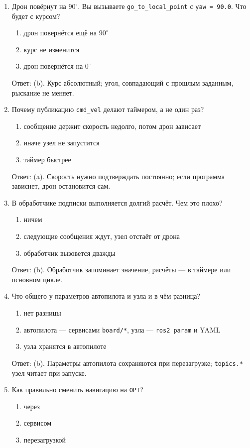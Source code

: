 \begin{enumerate}
  \item Дрон повёрнут на $90^\circ$. Вы вызываете \verb|go_to_local_point| с \verb|yaw = 90.0|. Что будет с курсом?
    \begin{enumerate}[label=(\alph*)] \item дрон повернётся ещё на $90^\circ$ \item курс не изменится \item дрон повернётся на $0^\circ$ \end{enumerate}
    Ответ: (b). Курс абсолютный; угол, совпадающий с прошлым заданным, рыскание не меняет.
  \item Почему публикацию \verb|cmd_vel| делают таймером, а не один раз?
    \begin{enumerate}[label=(\alph*)] \item сообщение держит скорость недолго, потом дрон зависает \item иначе узел не запустится \item таймер быстрее \end{enumerate}
    Ответ: (a). Скорость нужно подтверждать постоянно; если программа зависнет, дрон остановится сам.
  \item В обработчике подписки выполняется долгий расчёт. Чем это плохо?
    \begin{enumerate}[label=(\alph*)] \item ничем \item следующие сообщения ждут, узел отстаёт от дрона \item обработчик вызовется дважды \end{enumerate}
    Ответ: (b). Обработчик запоминает значение, расчёты --- в таймере или основном цикле.
  \item Что общего у параметров автопилота и узла и в чём разница?
    \begin{enumerate}[label=(\alph*)] \item нет разницы \item автопилота --- сервисами \texttt{board/*}, узла --- \texttt{ros2 param} и YAML \item узла хранятся в автопилоте \end{enumerate}
    Ответ: (b). Параметры автопилота сохраняются при перезагрузке; \verb|topics.*| узел читает при запуске.
  \item Как правильно сменить навигацию на \texttt{OPT}?
    \begin{enumerate}[label=(\alph*)] \item через  \item сервисом  \item перезагрузкой \end{enumerate}

\end{enumerate}
